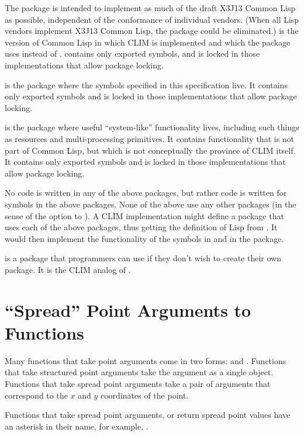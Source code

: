 The  package is intended to implement as much of the draft X3J13
Common Lisp as possible, independent of the conformance of individual vendors.
(When all Lisp vendors implement X3J13 Common Lisp, the  package
could be eliminated.)   is the version of Common Lisp in which
CLIM is implemented and which the  package uses instead of
.   contains only exported symbols, and is locked
in those implementations that allow package locking.

 is the package where the symbols specified in this specification live.
It contains only exported symbols and is locked in those implementations that
allow package locking.

 is the package where useful ``system-like'' functionality lives,
including such things as resources and multi-processing primitives.  It contains
functionality that is not part of Common Lisp, but which is not conceptually the
province of CLIM itself.  It contains only exported symbols and is locked in
those implementations that allow package locking.

No code is written in any of the above packages, but rather code is written for
symbols in the above packages.  None of the above use any other packages (in the
sense of the  option to ).  A CLIM implementation might
define a  package that uses each of the above packages, thus
getting the definition of Lisp from .  It would then implement the
functionality of the symbols in  and  in the
 package.

 is a package that programmers can use if they don't wish to
create their own package.  It is the CLIM analog of .


\section {``Spread'' Point Arguments to Functions \label{spread-vs-point}}

Many functions that take point arguments come in two forms: 
and .  Functions that take structured point arguments take the
argument as a single  object.  Functions that take spread point
arguments take a pair of arguments that correspond to the $x$ and $y$
coordinates of the point.

Functions that take spread point arguments, or return spread point values have
an asterisk in their name, for example, .


